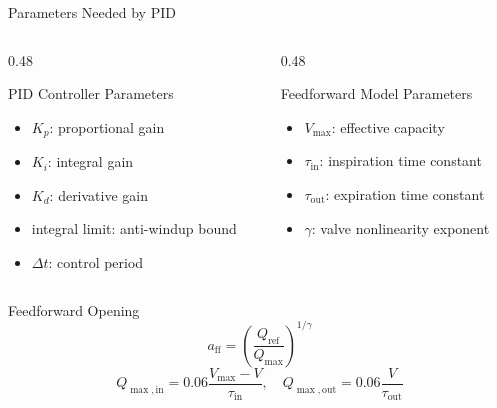 \documentclass[aspectratio=169,10pt]{beamer}
\begin{document}
\begin{frame}[shrink=5]{Parameters Needed by PID}
  \begin{columns}[T,onlytextwidth]
    \begin{column}{0.48\textwidth}
      \begin{block}{PID Controller Parameters}
        \begin{itemize}
          \item $K_p$: proportional gain
          \item $K_i$: integral gain
          \item $K_d$: derivative gain
          \item integral limit: anti-windup bound
          \item $\Delta t$: control period
        \end{itemize}
      \end{block}
    \end{column}
    \begin{column}{0.48\textwidth}
      \begin{block}{Feedforward Model Parameters}
        \begin{itemize}
          \item $V_{\max}$: effective capacity
          \item $\tau_{\mathrm{in}}$: inspiration time constant
          \item $\tau_{\mathrm{out}}$: expiration time constant
          \item $\gamma$: valve nonlinearity exponent
        \end{itemize}
      \end{block}
    \end{column}
  \end{columns}

  \vspace{0.4em}
  \begin{block}{Feedforward Opening}
    \[
      a_{\mathrm{ff}}=
      \left(\frac{Q_{\mathrm{ref}}}{Q_{\max}}\right)^{1/\gamma}
    \]
    \[
      Q_{\max,\mathrm{in}}=0.06\frac{V_{\max}-V}{\tau_{\mathrm{in}}},
      \quad
      Q_{\max,\mathrm{out}}=0.06\frac{V}{\tau_{\mathrm{out}}}
    \]
  \end{block}
\end{frame}
\end{document}

